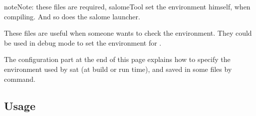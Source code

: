 \documentclass[a4paper,10pt,english]{sphinxmanual}
\begin{document}
\begin{sphinxadmonition}{note}{Note:}
these files are  required,
salomeTool set the environment himself, when compiling.
And so does the salome launcher.

These files are useful when someone wants to check the environment.
They could be used in debug mode to set the environment for .
\end{sphinxadmonition}

The configuration part at the end of this page explains how
to specify the environment used by sat (at build or run time),
and saved in some files by  command.


\subsection{Usage}
\end{document}

